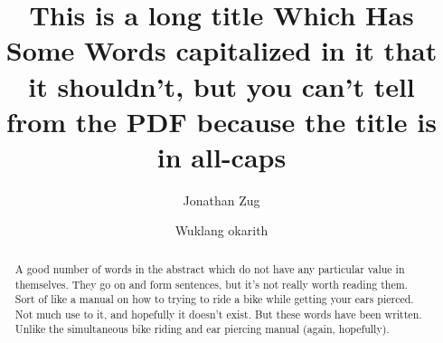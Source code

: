 \documentclass{amsart}
\title{This is a long title Which Has Some Words capitalized in it that it shouldn't, but you can't tell from the PDF because the title is in all-caps}
\author{Jonathan Zug}
\author{Wuklang okarith}
\begin{document}
\begin{abstract}
A good number of words in the abstract which do not have any particular value in themselves. They go on and form sentences, but it's not really worth reading them. Sort of like a manual on how to trying to ride a bike while getting your ears pierced. Not much use to it, and hopefully it doesn't exist. But these words have been written. Unlike the simultaneous bike riding and ear piercing manual (again, hopefully).
\end{abstract}

\maketitle
\end{document}
